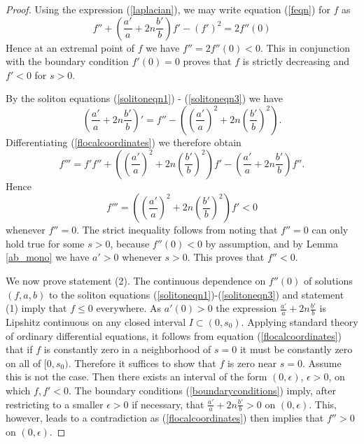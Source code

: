 \documentclass{amsart}
\theoremstyle{definition}
\theoremstyle{remark}
\numberwithin{equation}{section}
\begin{document}
\begin{proof}
Using the expression (\ref{laplacian}), we may write equation (\ref{feqn}) for $f$ as
\begin{equation}
\label{flocalcoordinates}
f'' + \left(\frac{a'}{a}+2n\frac{b'}{b}\right)f' - (f')^2 = 2f''(0)
\end{equation}
Hence at an extremal point of $f$ we have $f'' = 2f''(0) <0$. This in conjunction with the boundary condition $f'(0)=0$ proves that $f$ is strictly decreasing and $f' < 0$ for $s >0$. 

By the soliton equations (\ref{solitoneqn1}) - (\ref{solitoneqn3}) we have
\begin{equation*}
\left( \frac{a'}{a} + 2n \frac{b'}{b}\right)' = f'' - \left ( \left(\frac{a'}{a}\right)^2 +  2n\left(\frac{b'}{b}\right)^2\right ).
\end{equation*}
Differentiating (\ref{flocalcoordinates}) we therefore obtain
\begin{equation*}
f''' = f'f'' + \left ( \left(\frac{a'}{a}\right)^2 +  2n\left(\frac{b'}{b}\right)^2 \right) f' - \left( \frac{a'}{a} + 2n \frac{b'}{b}\right) f''.
\end{equation*}
Hence
\begin{equation}
\label{f3deriv-extrema}
f''' =\left ( \left(\frac{a'}{a}\right)^2 +  2n\left(\frac{b'}{b}\right)^2\right) f' < 0
\end{equation}
whenever $f''=0$. The strict inequality follows from noting that $f''=0$ can only hold true for some $s>0$, because $f''(0) < 0$ by assumption, and by Lemma \ref{ab_mono} we have $a' >0$ whenever $s>0$. This proves that $f'' < 0$. 

We now prove statement (2). The continuous dependence on $f''(0)$ of solutions $(f,a,b)$ to the soliton equations (\ref{solitoneqn1})-(\ref{solitoneqn3}) and statement (1) imply that $f \leq 0$ everywhere. As $a'(0)>0$ the expression $\frac{a'}{a} + 2n\frac{b'}{b}$ is Lipshitz continuous on any closed interval $I\subset (0,s_0)$. Applying standard theory of ordinary differential equations, it follows from equation (\ref{flocalcoordinates}) that if $f$ is constantly zero in a neighborhood of $s=0$ it must be constantly zero on all of $[0,s_0)$. Therefore it suffices to show that $f$ is zero near $s=0$. Assume this is not the case. Then there exists an interval of the form $(0,\epsilon)$, $\epsilon>0$, on which $f,f'<0$. The boundary conditions (\ref{boundaryconditions}) imply, after restricting to a smaller $\epsilon>0$ if necessary, that $\frac{a'}{a} +  2n\frac{b'}{b}>0$ on $(0,\epsilon)$. This, however, leads to a contradiction as (\ref{flocalcoordinates}) then implies that $f''>0$ on $(0,\epsilon)$. 
\end{proof}
\end{document}
